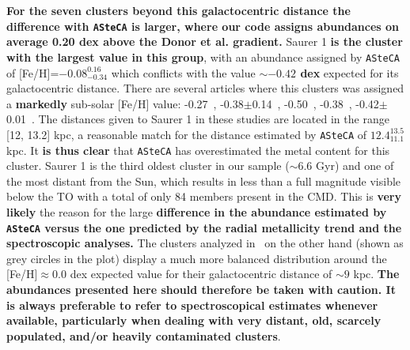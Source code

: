 \documentclass[referee]{aa}
\begin{document}
  \textbf{For the seven clusters beyond this galactocentric distance the
  difference with \texttt{ASteCA} is larger, where our code assigns abundances
  on average 0.20 dex above the Donor et al. gradient.}
  Saurer 1 \textbf{is the cluster with the largest value in this group}, with
  an abundance assigned by \texttt{ASteCA} of [Fe/H]=$-0.08_{-0.34}^{0.16}$
  which conflicts with the value \textbf{$\sim-0.42$ dex} expected for its
  galactocentric distance.
  There are several articles where this clusters was assigned a 
  \textbf{markedly} sub-solar [Fe/H] value: -0.27~\citep{Carraro_2003},
  -0.38$\pm$0.14~\citep{Carraro_2004},
  -0.50~\citep{Frinchaboy_2004b}, -0.38~\citep{Frinchaboy_2006},
  -0.42$\pm$0.01~\citep{Donor_2020}. The distances given to Saurer 1 in these
  studies are located in the range [12, 13.2] kpc, a reasonable match
  for the distance estimated by \texttt{ASteCA} of $12.4_{11.1}^{13.5}$ kpc. It
  \textbf{is thus clear} that \texttt{ASteCA} has overestimated the metal
  content for this cluster. Saurer 1 is the third oldest cluster in our sample 
  ($\sim6.6$ Gyr) and one of the most distant from the Sun, which results in
  less than a  full magnitude visible below the TO with a total of only 84
  members present in the CMD. This is \textbf{very likely} the reason
  for the large \textbf{difference in the abundance estimated by \texttt{ASteCA}
  versus the one predicted by the radial metallicity trend and the
  spectroscopic analyses.}
  The clusters analyzed in~\cite{Perren_2020} on the other hand (shown as grey
  circles in the plot) display a much more balanced distribution around the 
  [Fe/H]$\approx0.0$ dex expected value for their galactocentric distance of
  $\sim9$ kpc.
  \textbf{The abundances presented here should therefore be taken with
  caution. It is always preferable to refer to spectroscopical estimates
  whenever available, particularly when dealing with very distant, old,
  scarcely populated, and/or heavily contaminated clusters}.\\
\end{document}
